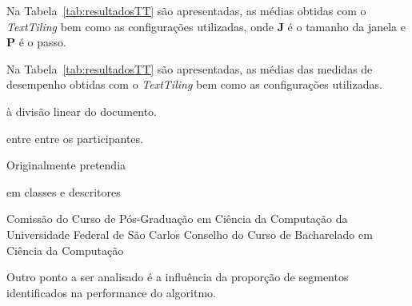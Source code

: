 
  Na Tabela~\ref{tab:resultadosTT} são apresentadas, as médias obtidas com o \textit{TextTiling} bem como as configurações utilizadas, onde \textbf{J} é o tamanho da janela e \textbf{P} é o passo.



Na Tabela~\ref{tab:resultadosTT} são apresentadas, as médias das medidas de desempenho obtidas com o \textit{TextTiling} bem como as configurações utilizadas.


















































à divisão linear do documento.  

entre entre os participantes. 







Originalmente pretendia 



em classes e descritores 



Comissão do Curso de Pós-Graduação em Ciência da Computação da Universidade Federal de São Carlos 
Conselho do Curso de Bacharelado em Ciência da Computação










Outro ponto a ser analisado é a influência da proporção de segmentos identificados na performance do algoritmo. 

